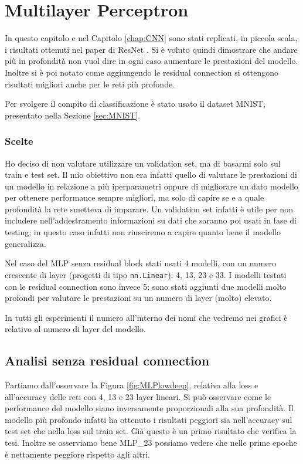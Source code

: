 \chapter{Multilayer Perceptron}
\label{chap:MLP}

In questo capitolo e nel Capitolo \ref{chap:CNN} sono stati replicati, in piccola scala, i risultati ottenuti nel paper di ResNet \cite{resnet}. Si è voluto quindi dimostrare che andare più in profondità non vuol dire in ogni caso aumentare le prestazioni del modello. Inoltre si è poi notato come aggiungendo le residual connection si ottengono risultati migliori anche per le reti più profonde.

Per svolgere il compito di classificazione è stato usato il dataset MNIST, presentato nella Sezione \ref{sec:MNIST}.

\subsection{Scelte}
Ho deciso di non valutare utilizzare un validation set, ma di basarmi solo sul train e test set. Il mio obiettivo non era infatti quello di valutare le prestazioni di un modello in relazione a più iperparametri oppure di migliorare un dato modello per ottenere performance sempre migliori, ma solo di capire se e a quale profondità la rete smetteva di imparare. Un validation set infatti è utile per non includere nell'addestramento informazioni su dati che saranno poi usati in fase di testing; in questo caso infatti non riusciremo a capire quanto bene il modello generalizza.

\myskip

Nel caso del MLP senza residual block stati usati 4 modelli, con un numero crescente di layer (progetti di tipo \texttt{nn.Linear}): 4, 13, 23 e 33.
I modelli testati con le residual connection sono invece 5: sono stati aggiunti due modelli molto profondi per valutare le prestazioni su un numero di layer (molto) elevato.

In tutti gli esperimenti il numero all'interno dei nomi che vedremo nei grafici è relativo al numero di layer del modello.

\section{Analisi senza residual connection}
Partiamo dall'osservare la Figura \ref{fig:MLPlowdeep}, relativa alla loss e all'accuracy delle reti con 4, 13 e 23 layer lineari. Si può osservare come le performance del modello siano inversamente proporzionali alla sua profondità. Il modello più profondo infatti ha ottenuto i risultati peggiori sia nell'accuracy sul test set che nella loss sul train set. Già questo è un primo risultato che verifica la tesi. Inoltre se osserviamo bene MLP\_23 possiamo vedere che nelle prime epoche è nettamente peggiore rispetto agli altri.

